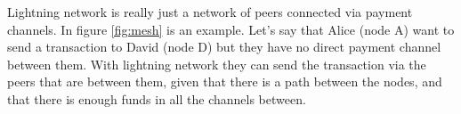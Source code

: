 Lightning network is really just a network of peers connected via payment channels. In figure \ref{fig:mesh} is an example. Let's say that Alice (node A) want to send a transaction to David (node D) but they have no direct payment channel between them. With lightning network they can send the transaction via the peers that are between them, given that there is a path between the nodes, and that there is enough funds in all the channels between.
